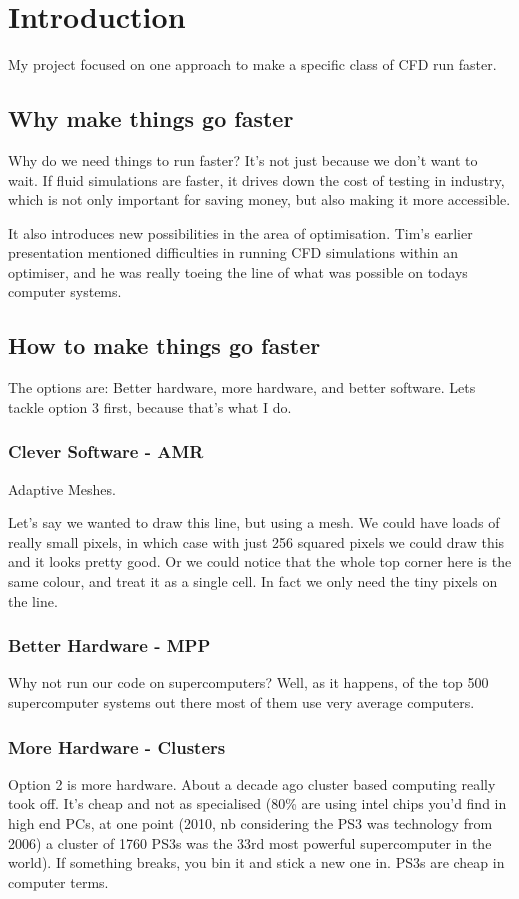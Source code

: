 \documentclass[12pt]{article}
\begin{document}
\section{Introduction}
    My project focused on one approach to make a specific class of CFD run faster.

    \subsection{Why make things go faster}
        Why do we need things to run faster? It's not just because we don't want to wait. If fluid simulations are faster, it drives down the cost of testing in industry, which is not only important for saving money, but also making it more accessible.
        
        It also introduces new possibilities in the area of optimisation. Tim's earlier presentation mentioned difficulties in running CFD simulations within an optimiser, and he was really toeing the line of what was possible on todays computer systems. 

    \subsection{How to make things go faster}
        The options are: Better hardware, more hardware, and better software. Lets tackle option 3 first, because that's what I do.

        \subsubsection{Clever Software - AMR}
            Adaptive Meshes.

            Let's say we wanted to draw this line, but using a mesh. We could have loads of really small pixels, in which case with just 256 squared pixels we could draw this and it looks pretty good. Or we could notice that the whole top corner here is the same colour, and treat it as a single cell. In fact we only need the tiny pixels on the line. 

        \subsubsection{Better Hardware - MPP}
            Why not run our code on supercomputers? Well, as it happens, of the top 500 supercomputer systems out there most of them use very average computers. 

        \subsubsection{More Hardware - Clusters}
            Option 2 is more hardware. About a decade ago cluster based computing really took off. It's cheap and not as specialised (80\% are using intel chips you'd find in high end PCs, at one point (2010, nb considering the PS3 was technology from 2006) a cluster of 1760 PS3s was the 33rd most powerful supercomputer in the world). If something breaks, you bin it and stick a new one in. PS3s are cheap in computer terms. 
\end{document}
